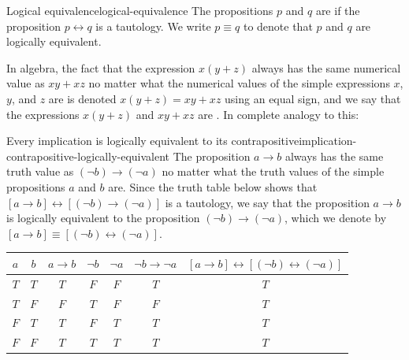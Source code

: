 \documentclass{book}
\theoremstyle{ekimcustom}
\newcommand\defn[1]{{\color{blue}{\bf #1}}}
\begin{document}
\begin{bdefinition}{Logical equivalence}{logical-equivalence}
The propositions $p$ and $q$ are \defn{logically equivalent} if the proposition $p \leftrightarrow q$ is a tautology. We write $p \equiv q$ to denote that $p$ and $q$ are logically equivalent.
\end{bdefinition}
In algebra, the fact that the expression $x(y+z)$ always has the same numerical value as $xy+xz$ no matter what the numerical values of the simple expressions $x$, $y$, and $z$ are is denoted $x(y+z)=xy+xz$ using an equal sign, and we say that the expressions $x(y+z)$ and $xy+xz$ are \defn{equal}. In complete analogy to this:
\begin{bexample}{Every implication is logically equivalent to its contrapositive}{implication-contrapositive-logically-equivalent}
The proposition $a \rightarrow b$ always has the same truth value as $(\neg b) \rightarrow (\neg a)$ no matter what the truth values of the simple propositions $a$ and $b$ are. Since the truth table below shows that $[a \rightarrow b] \leftrightarrow [(\neg b) \rightarrow (\neg a)]$ is a tautology, we say that the proposition $a \rightarrow b$ is logically equivalent to the proposition $(\neg b) \rightarrow (\neg a)$, which we denote by $[a \rightarrow b] \equiv [(\neg b) \leftrightarrow (\neg a)]$.
\begin{center}
\begin{tabular}{c|c||c|c|c|c|c}
$a$ & $b$ & $a \rightarrow b$ & $\neg b$ & $\neg a$ & $\neg b \rightarrow \neg a$ & $[a \rightarrow b] \leftrightarrow [(\neg b) \leftrightarrow (\neg a)]$ \\\hline
$T$ & $T$ & $T$ & $F$ & $F$ & $T$ & $T$\\
$T$ & $F$ & $F$ & $T$ & $F$ & $F$ & $T$\\
$F$ & $T$ & $T$ & $F$ & $T$ & $T$ & $T$\\
$F$ & $F$ & $T$ & $T$ & $T$ & $T$ & $T$
\end{tabular}
\end{center}

\end{bexample}
\end{document}
